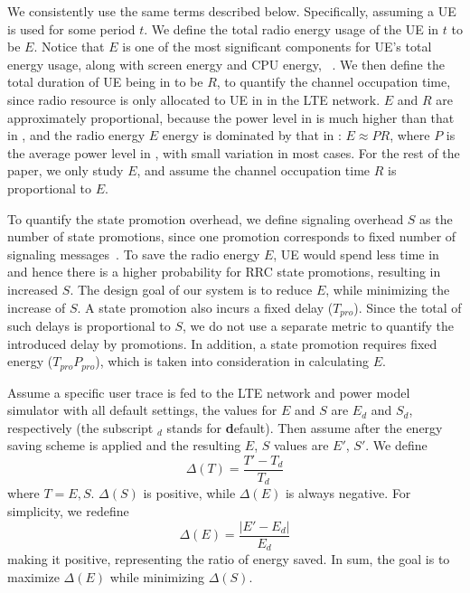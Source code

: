 We consistently use the same terms described below. Specifically, assuming a UE is used for some period $t$. We define the total radio energy usage of the UE in $t$ to be $E$. Notice that $E$ is one of the most significant components for UE's total energy usage, along with screen energy and CPU energy, \etc~\cite{mobisys.aro}. We then define the total duration of UE being in \RC to be $R$, to quantify the channel occupation time, since radio resource is only allocated to UE in \RC in the LTE network. $E$ and $R$ are approximately proportional, because the power level in \RC is much higher than that in \RI, and the radio energy $E$ energy is dominated by that in \RC: $E \approx PR$, where $P$ is the average power level in \RC, with small variation in most cases. For the rest of the paper, we only study $E$, and assume the channel occupation time $R$ is proportional to $E$.

To quantify the state promotion overhead, we define signaling overhead $S$ as the number of state promotions, since one promotion corresponds to fixed number of signaling messages~\cite{radiojockey}. To save the radio energy $E$, UE would spend less time in \RC and hence there is a higher probability for RRC state promotions, resulting in increased $S$. The design goal of our system is to reduce $E$, while minimizing the increase of $S$. A state promotion also incurs a fixed delay ($T_{pro}$). Since the total of such delays is proportional to $S$, we do not use a separate metric to quantify the introduced delay by promotions. In addition, a state promotion requires fixed energy ($T_{pro}P_{pro}$), which is taken into consideration in calculating $E$.

Assume a specific user trace is fed to the LTE network and power model simulator with all default settings, the values for $E$ and $S$ are $E_{d}$ and $S_{d}$, respectively (the subscript $_{d}$ stands for \textbf{d}efault). Then assume after the energy saving scheme is applied and the resulting $E$, $S$ values are $E'$, $S'$. We define
\begin{displaymath}
\Delta(T) = \frac{T' - T_{d}}{T_{d}}
\end{displaymath}
where $T = E, S$. $\Delta(S)$ is positive, while $\Delta(E)$ is always negative. For simplicity, we redefine
\begin{displaymath}
\Delta(E) = \frac{|E' - E_{d}|}{E_{d}}
\end{displaymath}
making it positive, representing the ratio of energy saved. In sum, the goal is to maximize $\Delta(E)$ while minimizing $\Delta(S)$.


